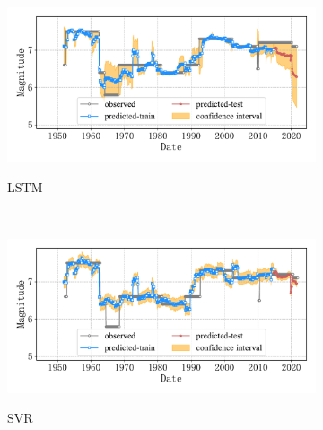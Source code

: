 \begin{figure}[!htbp]
  \vspace{-2cm}
  \centering
  \begin{subfigure}[b]{0.45\textwidth}
    \caption{LSTM}
    \includegraphics[width=\textwidth]{Img/chap5_seism/split90/seism_lstm_minyear_1932_maxyear_2021_spanlat_2_spanlon_4_timewindow_120_nextmonth_120_minmag_3.0_split_ratio_0.9_blocks1.pdf}
    \vspace{-1cm}
    \label{fig:seism_lstm_minyear_1932_maxyear_2021_spanlat_2_spanlon_4_timewindow_120_nextmonth_120_minmag_3.0_split_ratio_0.9_blocks1}
  \end{subfigure}
  ~
  \begin{subfigure}[b]{0.45\textwidth}
    \caption{SVR} 
    \includegraphics[width=\textwidth]{Img/chap5_seism/split90/seism_svr_minyear_1932_maxyear_2021_spanlat_2_spanlon_4_timewindow_120_nextmonth_120_minmag_3.0_split_ratio_0.9_blocks1.pdf}
    \vspace{-1cm}
    \label{fig:seism_svr_minyear_1932_maxyear_2021_spanlat_2_spanlon_4_timewindow_120_nextmonth_120_minmag_3.0_split_ratio_0.9_blocks1}
  \end{subfigure}   
  \\
  \begin{subfigure}[b]{0.45\textwidth}

\end{subfigure}
\end{figure}
